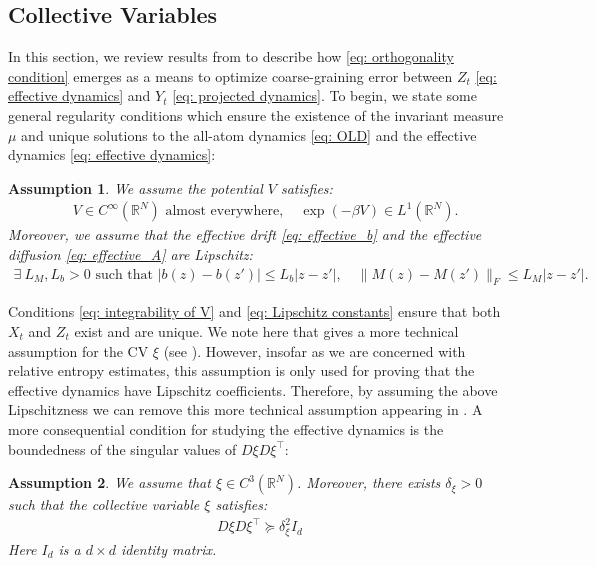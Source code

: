\documentclass[reqno, 12pt]{article}
\newtheorem{assumption}{Assumption}
\begin{document}
\subsection{Collective Variables} 
In this section, we review results from \cite{legoll2010effective, duong2018quantification, Lelièvre2019} to describe how \eqref{eq: orthogonality condition} emerges as a means to optimize coarse-graining error between $Z_t$ \eqref{eq: effective dynamics} and $Y_t$ \eqref{eq: projected dynamics}. To begin, we state some general regularity conditions which ensure the existence of the invariant measure $\mu$ and unique solutions to the all-atom dynamics \eqref{eq: OLD} and the effective dynamics \eqref{eq: effective dynamics}:
\begin{assumption}
\label{ass: existence and uniqueness}
    We assume the potential $V$ satisfies: 
    \begin{align}
        &V \in C^{\infty}(\mathbb{R}^{N}) \text{ almost everywhere}, \quad \exp{(-\beta V)} \in L^{1}(\mathbb{R}^{N}). \label{eq: integrability of V}
    \end{align}
    Moreover, we assume that the effective drift \eqref{eq: effective_b} and the effective diffusion \eqref{eq: effective_A} are Lipschitz: 
    \begin{align}
         \exists \: L_M, L_b > 0 \text{ such that }|b(z) - b(z')| \leq L_b|z - z'|, \quad \|M(z) - M(z')\|_F \leq L_M|z - z'|. \label{eq: Lipschitz constants}
    \end{align}
\end{assumption}
Conditions \eqref{eq: integrability of V} and \eqref{eq: Lipschitz constants} ensure that both $X_t$ and $Z_t$ exist and are unique. We note here that \cite{duong2018quantification} gives a more technical assumption for the CV $\xi$ (see \cite[Eq. (C3)]{duong2018quantification}). However, insofar as we are concerned with relative entropy estimates, this assumption is only used for proving that the effective dynamics have Lipschitz coefficients. Therefore, by assuming the above Lipschitzness we can remove this more technical assumption appearing in \cite{duong2018quantification}. A more consequential condition for studying the effective dynamics is the boundedness of the singular values of $D\xi D\xi^{\top}$:
\begin{assumption}
\label{ass: xi}
We assume that $\xi \in C^{3}(\mathbb{R}^{N})$. Moreover, there exists $\delta_{\xi} > 0$ such that the collective variable $\xi$ satisfies: 
    \begin{align}
        D\xi D\xi^{\top} \succcurlyeq \delta^{2}_{\xi} I_{d}
    \end{align}
    Here $I_d$ is a $d \times d$ identity matrix.
\end{assumption}
\end{document}
